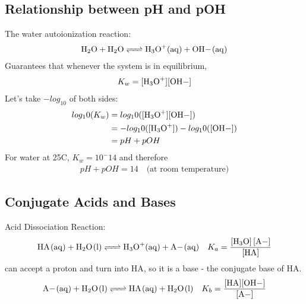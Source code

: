 \documentclass{article}  %
\begin{document}
\subsection*{Relationship between pH and pOH}
The water autoionization reaction:
\begin{equation*}
    \begin{aligned}
        \ce{H2O + H2O <=> H3O+_(aq) + OH-_(aq)}
    \end{aligned}
\end{equation*}
Guarantees that whenever the system is in equilibrium,
\begin{equation*}
    \begin{aligned}
        K_w = \ce{[H3O+][OH-]}
    \end{aligned}
\end{equation*}
Let's take $-log_10$ of both sides:
\begin{equation*}
    \begin{aligned}
        log_10(K_w) &= log_10(\ce{[H3O+][OH-]}) \\
                    &= -log_10(\ce{[H3O+]}) - log_10(\ce{[OH-]}) \\
                    &= pH + pOH
    \end{aligned}
\end{equation*}
For water at 25C, $K_w = 10^-14$ and therefore
\begin{equation*}
    \begin{aligned}
        pH + pOH = 14 \quad \text{(at room temperature)}
    \end{aligned}
\end{equation*}

\subsection*{Conjugate Acids and Bases}
Acid Dissociation Reaction:
\begin{equation*}
    \begin{aligned}
        \ce{HA_(aq) + H2O_(l) <=> H3O+_(aq) + A-_(aq)} \quad K_a = \ce{\frac{[H3O] [A-]}{[HA]}}
    \end{aligned}
\end{equation*}
 can accept a proton and turn into HA, so it is a base - the conjugate base of HA.
\begin{equation*}
    \begin{aligned}
        \ce{A-_(aq) + H2O_(l) <=> HA_(aq) + H2O_(l) } \quad K_b = \ce{\frac{[HA][OH-]}{[A-]}}
    \end{aligned}
\end{equation*}
\end{document}
